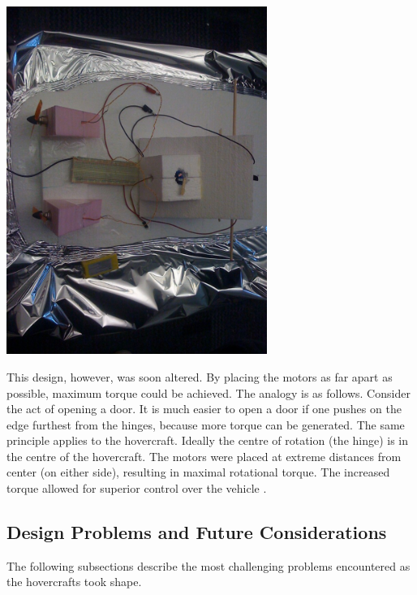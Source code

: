 \begin{minipage}{6.5in}
  \begin{center}
    \includegraphics[width=85mm]{imageSources/thrustControl2.png}
  \end{center}
  \label{thrustControl2}
\end{minipage}

This design, however, was soon altered. By placing the motors as far apart as possible, maximum torque could be achieved. The analogy is as follows. Consider the act of opening a door. It is much easier to open a door if one pushes on the edge furthest from the hinges, because more torque can be generated. The same principle applies to the hovercraft. Ideally the centre of rotation (the hinge) is in the centre of the hovercraft. The motors were placed at extreme distances from center (on either side), resulting in maximal rotational torque.   The increased torque allowed for superior control over the vehicle \cite{831309}. 

\subsection{Design Problems and Future Considerations}
The following subsections describe the most challenging problems encountered as the hovercrafts took shape.  

